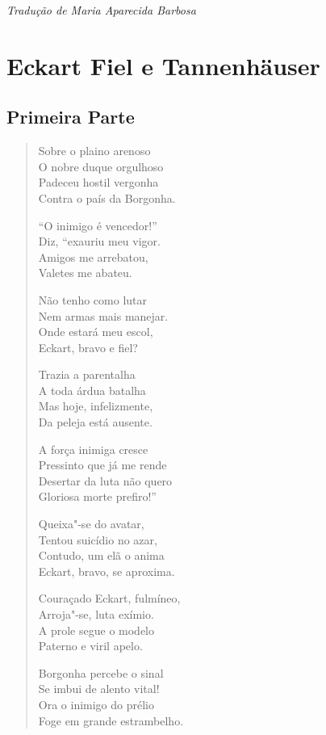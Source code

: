 \hfill\textit{Tradução de Maria Aparecida Barbosa}

\chapter[Eckart Fiel e Tannenhäuser]{Eckart Fiel e Tannenhäuser}

\section*{Primeira Parte}


\begin{verse}
Sobre o plaino arenoso\\
O nobre duque orgulhoso\\
Padeceu hostil vergonha\\
Contra o país da Borgonha.

``O inimigo é vencedor!''\\
Diz, ``exauriu meu vigor.\\
Amigos me arrebatou,\\
Valetes me abateu.

Não tenho como lutar\\
Nem armas mais manejar.\\
Onde estará meu escol,\\
Eckart, bravo e fiel?

Trazia a parentalha\\
A toda árdua batalha\\
Mas hoje, infelizmente,\\
Da peleja está ausente.

A força inimiga cresce\\  
Pressinto que já me rende\\
Desertar da luta não quero\\
Gloriosa morte prefiro!''

Queixa"-se do avatar,\\
Tentou suicídio no azar,\\
Contudo, um  elã o anima\\
Eckart, bravo, se aproxima. 

Couraçado Eckart, fulmíneo,\\ 
Arroja"-se, luta exímio.\\
A prole segue o modelo\\
Paterno e viril apelo.

Borgonha percebe o sinal\\
Se imbui de alento vital!\\
Ora o inimigo do prélio\\
Foge em grande estrambelho.


\end{verse}
